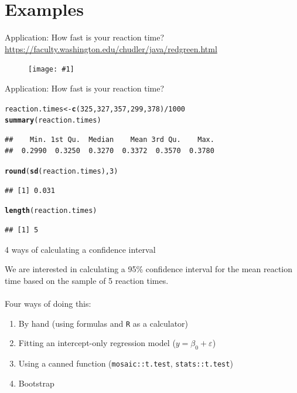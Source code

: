 \documentclass{beamer}\usepackage[]{graphicx}\usepackage[]{color}
\newcommand{\hlnum}[1]{\textcolor[rgb]{0.686,0.059,0.569}{#1}}%
\newcommand{\hlopt}[1]{\textcolor[rgb]{0,0,0}{#1}}%
\newcommand{\hlstd}[1]{\textcolor[rgb]{0.345,0.345,0.345}{#1}}%
\newcommand{\hlkwb}[1]{\textcolor[rgb]{0.69,0.353,0.396}{#1}}%
\newcommand{\hlkwd}[1]{\textcolor[rgb]{0.737,0.353,0.396}{\textbf{#1}}}%
\newenvironment{knitrout}{}{} %
\newcommand {\framedgraphic}[1] {
	\begin{figure}
		\centering
		\texttt{[image: \#1]}
	\end{figure}
}
\begin{document}
\section{Examples}


\begin{frame}{Application: How fast is your reaction time?}
\small\url{https://faculty.washington.edu/chudler/java/redgreen.html} 

\framedgraphic{JHReactionTimes.png}

\end{frame}


\begin{frame}[fragile]{Application: How fast is your reaction time?}
\begin{knitrout}\scriptsize
{}\color{fgcolor}
\begin{alltt}
\hlstd{reaction.times} \hlkwb{<-} \hlkwd{c}\hlstd{(}\hlnum{325}\hlstd{,}\hlnum{327}\hlstd{,}\hlnum{357}\hlstd{,}\hlnum{299}\hlstd{,}\hlnum{378}\hlstd{)}\hlopt{/}\hlnum{1000}
\hlkwd{summary}\hlstd{(reaction.times)}
\end{alltt}
\begin{verbatim}
##    Min. 1st Qu.  Median    Mean 3rd Qu.    Max. 
##  0.2990  0.3250  0.3270  0.3372  0.3570  0.3780
\end{verbatim}
\begin{alltt}
\hlkwd{round}\hlstd{(}\hlkwd{sd}\hlstd{(reaction.times),}\hlnum{3}\hlstd{)}
\end{alltt}
\begin{verbatim}
## [1] 0.031
\end{verbatim}
\begin{alltt}
\hlkwd{length}\hlstd{(reaction.times)}
\end{alltt}
\begin{verbatim}
## [1] 5
\end{verbatim}

\end{knitrout}

\end{frame}


\begin{frame}[fragile]{4 ways of calculating a confidence interval}

We are interested in calculating a 95\% confidence interval for the mean reaction time based on the sample of 5 reaction times. \\ \ \\
\pause
Four ways of doing this:
\begin{enumerate}
	\setlength\itemsep{1em}
	\item By hand (using formulas and \texttt{R} as a calculator)
	\item Fitting an intercept-only regression model ($y = \beta_0 + \varepsilon$)
	\item Using a canned function (\texttt{mosaic::t.test}, \texttt{stats::t.test})
	\item Bootstrap
\end{enumerate}

\end{frame}
\end{document}

